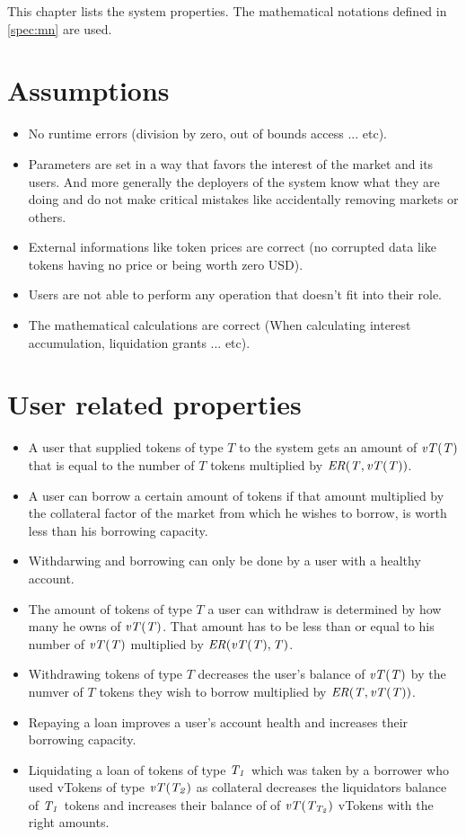 
This chapter lists the system properties. The mathematical notations defined in \ref{spec:mn} are used.

\section{Assumptions}

\begin{itemize}
  \item No runtime errors (division by zero, out of bounds access ... etc).
  \item Parameters are set in a way that favors the interest of the market and its users. And more generally the deployers of the system know what they are doing and do not make critical mistakes like accidentally removing markets or others.
  \item External informations like token prices are correct (no corrupted data like tokens having no price or being worth zero USD).
  \item Users are not able to perform any operation that doesn't fit into their role.
  \item The mathematical calculations are correct (When calculating interest accumulation, liquidation grants ... etc).
\end{itemize}

\section{User related properties}

\begin{itemize}
  \item A user that supplied tokens of type $T$ to the system gets an amount of $\mathit{vT(T)}$ that is equal to the number of $T$ tokens multiplied by $\mathit{ER(T, \mathit{vT(T)})}$.
  
  \item A user can borrow a certain amount of tokens if that amount multiplied by the collateral factor of the market from which he wishes to borrow, is worth less than his borrowing capacity.
  
  \item Withdarwing and borrowing can only be done by a user with a healthy account.
  \item The amount of tokens of type $T$ a user can withdraw is determined by how many he owns of $\mathit{vT(T)}$. That amount has to be less than or equal to his number of $\mathit{vT(T)}$ multiplied by $\mathit{ER(\mathit{vT(T)}, T)}$.
  \item Withdrawing tokens of type $T$ decreases the user's balance of $\mathit{vT(T)}$ by the numver of $T$ tokens they wish to borrow multiplied by $\mathit{ER(T, \mathit{vT(T)})}$.
  
  \item Repaying a loan improves a user's account health and increases their borrowing capacity.

  \item Liquidating a loan of tokens of type $\mathit{T_{1}}$ which was taken by a borrower who used vTokens of type $\mathit{vT(\mathit{T_{2}})}$ as collateral decreases the liquidators balance of $\mathit{T_{1}}$ tokens and increases their balance of of $\mathit{vT(\mathit{T_{T_2}})}$ vTokens with the right amounts.
\end{itemize}

